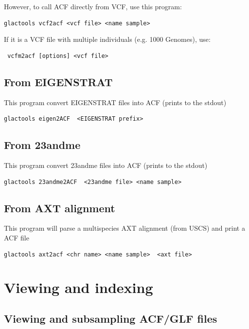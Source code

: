 \documentclass[a4paper]{article}
\begin{document}
However, to call ACF directly from VCF, use this program:

\begin{lstlisting}
glactools vcf2acf <vcf file> <name sample> 
\end{lstlisting}

If it is a VCF file with multiple individuals (e.g. 1000 Genomes), use:
\begin{lstlisting}
 vcfm2acf [options] <vcf file>
\end{lstlisting}

\subsection{From EIGENSTRAT}

\noindent This program convert EIGENSTRAT files into ACF (prints to the stdout)

\begin{lstlisting}
glactools eigen2ACF  <EIGENSTRAT prefix>
\end{lstlisting}


\subsection{From 23andme}

\noindent This program convert 23andme files into ACF (prints to the stdout)

\begin{lstlisting}
glactools 23andme2ACF  <23andme file> <name sample>
\end{lstlisting}

\subsection{From AXT alignment}

\noindent This program will parse a multispecies AXT alignment (from USCS) and print a ACF file

\begin{lstlisting}
glactools axt2acf <chr name> <name sample>  <axt file>
\end{lstlisting}

\newpage
\section{Viewing and indexing}

\subsection{Viewing and subsampling ACF/GLF files }
\end{document}
